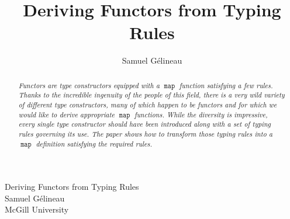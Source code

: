 \documentclass{article}
\title{Deriving Functors from Typing Rules}
\author{Samuel G\'elineau}
\newcommand{\map}{\ensuremath{\mathop{\mathtt{map}}}}
\begin{document}
\begin{center}
{\larger[3] Deriving Functors from Typing Rules}\\
\vspace{\bigskipamount}
{\larger Samuel G\'elineau}\\
McGill University
\end{center}

\begin{abstract}\em
Functors are type constructors equipped with a $\map$ function satisfying a few rules. Thanks to the incredible ingenuity of the people of this field, there is a very wild variety of different type constructors, many of which happen to be functors and for which we would like to derive appropriate $\map$ functions. While the diversity is impressive, every single type constructor should have been introduced along with a set of typing rules governing its use. The paper shows how to transform those typing rules into a $\map$ definition satisfying the required rules.
\end{abstract}
\end{document}
